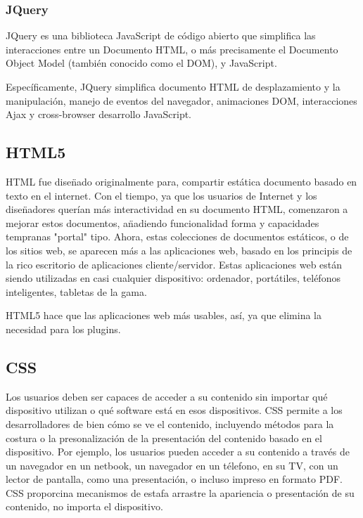 \subsubsection{JQuery}

JQuery es una biblioteca JavaScript de c\'{o}digo abierto que simplifica las interacciones entre un Documento HTML, o m\'{a}s 
precisamente el Documento Object Model (tambi\'{e}n conocido como el DOM), y JavaScript.

Espec\'{i}ficamente, JQuery simplifica documento HTML de desplazamiento y la manipulaci\'{o}n, manejo de eventos del navegador,
animaciones DOM, interacciones Ajax y cross-browser desarrollo JavaScript.\cite{lindley2009jquery}

\subsection{HTML5}

HTML fue dise\"{n}ado originalmente para, compartir est\'{a}tica documento basado en texto en el internet. Con el tiempo, ya que 
los usuarios de Internet y los dise\"{n}adores quer\'{i}an m\'{a}s interactividad en su documento HTML, comenzaron a mejorar estos
documentos, a\"{n}adiendo funcionalidad forma y capacidades tempranas "portal" tipo. Ahora, estas colecciones de documentos 
est\'{a}ticos, o de los sitios web, se aparecen m\'{a}s a las aplicaciones web, basado en los principis de la rico escritorio de
aplicaciones cliente/servidor. Estas aplicaciones web est\'{a}n siendo utilizadas en casi cualquier dispositivo: ordenador, 
port\'{a}tiles, tel\'{e}fonos inteligentes, tabletas de la gama.

HTML5 hace que las aplicaciones web m\'{a}s usables, as\'{i}, ya que elimina la necesidad para los plugins. \cite{wang2013definitive}


\subsection{CSS}

Los usuarios deben ser capaces de acceder a su contenido sin importar qu\'{e} dispositivo utilizan o qu\'{e} software est\'{a} en
esos dispositivos. CSS permite a los desarrolladores de bien c\'{o}mo se ve el contenido, incluyendo m\'{e}todos para la costura o
la presonalizaci\'{o}n de la presentaci\'{o}n del contenido basado en el dispositivo. Por ejemplo, los usuarios pueden acceder a su
contenido a trav\'{e}s de un navegador en un netbook, un navegador en un t\'{e}lefono, en su TV, con un lector de pantalla, como una
presentaci\'{o}n, o incluso impreso en formato PDF. CSS proporcina mecanismos de estafa arrastre la apariencia o presentaci\'{o}n de 
su contenido, no importa el dispositivo.\cite{weyl2012s}

